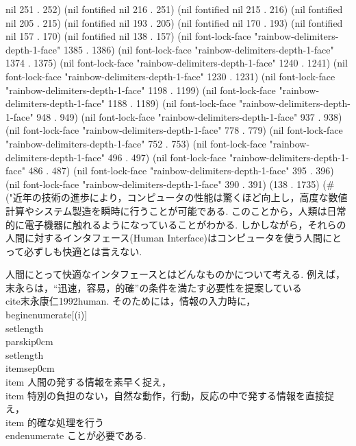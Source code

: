 nil 251 . 252) (nil fontified nil 216 . 251) (nil fontified nil 215 . 216) (nil fontified nil 205 . 215) (nil fontified nil 193 . 205) (nil fontified nil 170 . 193) (nil fontified nil 157 . 170) (nil fontified nil 138 . 157) (nil font-lock-face "rainbow-delimiters-depth-1-face" 1385 . 1386) (nil font-lock-face "rainbow-delimiters-depth-1-face" 1374 . 1375) (nil font-lock-face "rainbow-delimiters-depth-1-face" 1240 . 1241) (nil font-lock-face "rainbow-delimiters-depth-1-face" 1230 . 1231) (nil font-lock-face "rainbow-delimiters-depth-1-face" 1198 . 1199) (nil font-lock-face "rainbow-delimiters-depth-1-face" 1188 . 1189) (nil font-lock-face "rainbow-delimiters-depth-1-face" 948 . 949) (nil font-lock-face "rainbow-delimiters-depth-1-face" 937 . 938) (nil font-lock-face "rainbow-delimiters-depth-1-face" 778 . 779) (nil font-lock-face "rainbow-delimiters-depth-1-face" 752 . 753) (nil font-lock-face "rainbow-delimiters-depth-1-face" 496 . 497) (nil font-lock-face "rainbow-delimiters-depth-1-face" 486 . 487) (nil font-lock-face "rainbow-delimiters-depth-1-face" 395 . 396) (nil font-lock-face "rainbow-delimiters-depth-1-face" 390 . 391) (138 . 1735) (#("近年の技術の進歩により，コンピュータの性能は驚くほど向上し，高度な数値計算やシステム製造を瞬時に行うことが可能である.
このことから，人類は日常的に電子機器に触れるようになっていることがわかる.
しかしながら，それらの人間に対するインタフェース(Human Interface)はコンピュータを使う人間にとって必ずしも快適とは言えない.


人間にとって快適なインタフェースとはどんなものかについて考える.
例えば，末永らは，``迅速，容易，的確''の条件を満たす必要性を提案している\\cite{末永康仁1992human}.
そのためには，情報の入力時に，
\\begin{enumerate}[(i)]
 \\setlength{\\parskip}{0cm} %
 \\setlength{\\itemsep}{0cm} %
 \\item 人間の発する情報を素早く捉え，
 \\item 特別の負担のない，自然な動作，行動，反応の中で発する情報を直接捉え，
 \\item 的確な処理を行う
\\end{enumerate}
ことが必要である.

